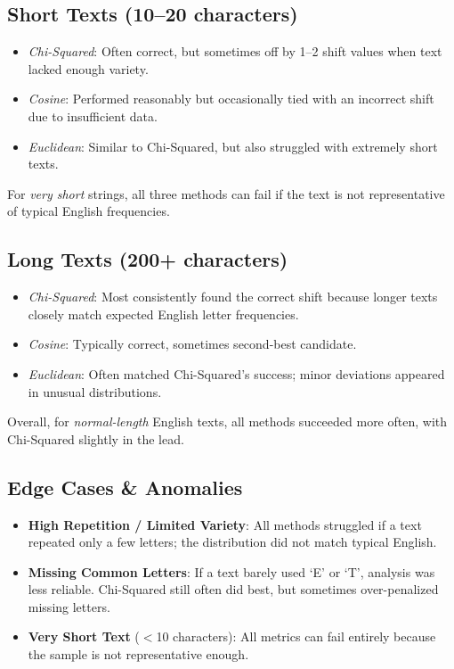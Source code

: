 \documentclass[11pt]{article}
\begin{document}
\subsection{Short Texts (10--20 characters)}
\begin{itemize}
\item \emph{Chi-Squared}: Often correct, but sometimes off by 1--2 shift values when text lacked enough variety.
\item \emph{Cosine}: Performed reasonably but occasionally tied with an incorrect shift due to insufficient data.
\item \emph{Euclidean}: Similar to Chi-Squared, but also struggled with extremely short texts.
\end{itemize}
For \emph{very short} strings, all three methods can fail if the text is not representative of typical English frequencies.

\subsection{Long Texts (200+ characters)}
\begin{itemize}
\item \emph{Chi-Squared}: Most consistently found the correct shift because longer texts closely match expected English letter frequencies.
\item \emph{Cosine}: Typically correct, sometimes second-best candidate.
\item \emph{Euclidean}: Often matched Chi-Squared's success; minor deviations appeared in unusual distributions.
\end{itemize}
Overall, for \emph{normal-length} English texts, all methods succeeded more often, with Chi-Squared slightly in the lead.

\subsection{Edge Cases \& Anomalies}
\begin{itemize}
\item \textbf{High Repetition / Limited Variety}: All methods struggled if a text repeated only a few letters; the distribution did not match typical English.
\item \textbf{Missing Common Letters}: If a text barely used `E' or `T', analysis was less reliable. Chi-Squared still often did best, but sometimes over-penalized missing letters.
\item \textbf{Very Short Text} ($<$10 characters): All metrics can fail entirely because the sample is not representative enough.
\end{itemize}
\end{document}
